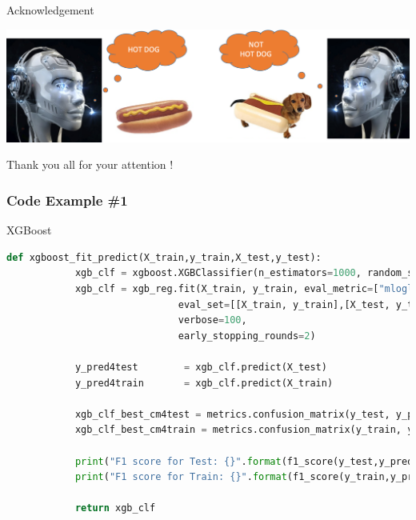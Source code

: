 \documentclass{if-beamer}
\begin{document}
  
\begin{frame}{Acknowledgement}    
 
   \centering \includegraphics[scale=0.3]{./figs/hotdog.png}
 

  \centering  \Huge Thank you all for your attention !
 
  \end{frame}




   

\begin{frame}[fragile]
\frametitle{Code Example \#1}


 \begin{exampleblock}{XGBoost}
 
      \begin{lstlisting}[language=Python]
      def xgboost_fit_predict(X_train,y_train,X_test,y_test):
            xgb_clf = xgboost.XGBClassifier(n_estimators=1000, random_state=42)
            xgb_clf = xgb_reg.fit(X_train, y_train, eval_metric=["mlogloss"],
                              eval_set=[[X_train, y_train],[X_test, y_test]],
                              verbose=100,
                              early_stopping_rounds=2)
             
            y_pred4test        = xgb_clf.predict(X_test)
            y_pred4train       = xgb_clf.predict(X_train)
            
            xgb_clf_best_cm4test = metrics.confusion_matrix(y_test, y_pred4test)
            xgb_clf_best_cm4train = metrics.confusion_matrix(y_train, y_pred4train)
            
            print("F1 score for Test: {}".format(f1_score(y_test,y_pred4test, average='weighted')))
            print("F1 score for Train: {}".format(f1_score(y_train,y_pred4train, average='weighted'))) 
            
            return xgb_clf
      \end{lstlisting}
 \end{exampleblock}


\end{frame}
\end{document}
